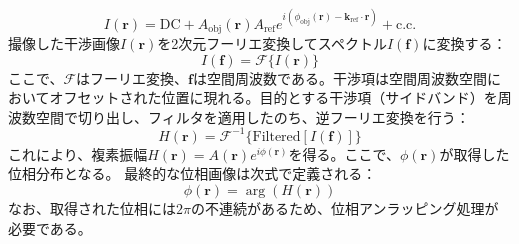 \begin{equation}
I(\bm{r}) = \text{DC} + A_{\mathrm{obj}}(\bm{r}) A_{\mathrm{ref}} e^{i (\phi_{\mathrm{obj}}(\bm{r}) - \bm{k}_{\mathrm{ref}} \cdot \bm{r})} + \text{c.c.}
\end{equation}
撮像した干渉画像$I(\bm{r})$を2次元フーリエ変換してスペクトル$I(\bm{f})$に変換する：
\begin{equation}
I(\bm{f}) = \mathcal{F}\{ I(\bm{r}) \}
\end{equation}
ここで、$\mathcal{F}$はフーリエ変換、$\bm{f}$は空間周波数である。干渉項は空間周波数空間においてオフセットされた位置に現れる。目的とする干渉項（サイドバンド）を周波数空間で切り出し、フィルタを適用したのち、逆フーリエ変換を行う：
\begin{equation}
H(\bm{r}) = \mathcal{F}^{-1}\{ \text{Filtered}[I(\bm{f})] \}
\end{equation}
これにより、複素振幅$H(\bm{r}) = A(\bm{r}) e^{i \phi(\bm{r})}$を得る。ここで、$\phi(\bm{r})$が取得した位相分布となる。
最終的な位相画像は次式で定義される：
\begin{equation}
\phi(\bm{r}) = \arg \left( H(\bm{r}) \right)
\end{equation}
なお、取得された位相には$2\pi$の不連続があるため、位相アンラッピング処理が必要である。


